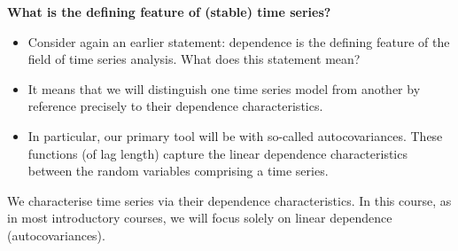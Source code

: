 \documentclass[
  letterpaper,
  DIV=11,
  numbers=noendperiod]{scrartcl}
\newcommand{\slidelabel}[1]{{\color{embernavy}\bfseries\large #1\par\vspace{5pt}}}
\newenvironment{slidefooter}{%
  \par\vspace{7pt}{\color{emberrule}\rule{\linewidth}{0.4pt}}\par\vspace{4pt}%
  \color{emberamber}\itshape\small}{\par}
\begin{document}
\begin{slidebox}

\slidelabel{What is the defining feature of (stable) time series?}

\begin{itemize}
\item
  Consider again an earlier statement: dependence is the defining
  feature of the field of time series analysis. What does this statement
  mean?
\item
  It means that we will distinguish one time series model from another
  by reference precisely to their dependence characteristics.
\item
  In particular, our primary tool will be with so-called
  autocovariances. These functions (of lag length) capture the linear
  dependence characteristics between the random variables comprising a
  time series.
\end{itemize}

\begin{slidefooter}

{We characterise time series via their dependence characteristics. In
this course, as in most introductory courses, we will focus solely on
linear dependence (autocovariances).}

\end{slidefooter}

\end{slidebox}
\end{document}
